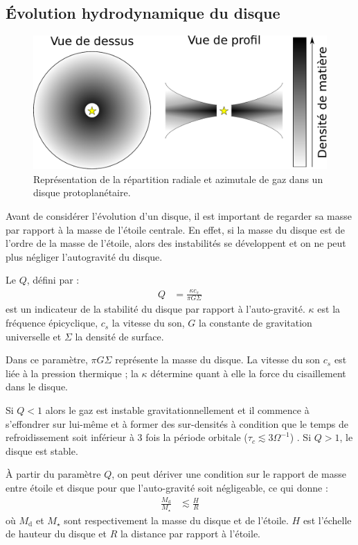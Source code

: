 \subsection{Évolution hydrodynamique du disque}
\begin{figure}[htbp]
\centering
\includegraphics[width=0.6\linewidth]{figure/disk_scheme.pdf}
\caption[Vue de face et de profil d'un disque de gaz.]{Représentation de la répartition radiale et azimutale
de gaz dans un disque protoplanétaire.}\label{fig:disk_scheme}
\end{figure}

Avant de considérer l'évolution d'un disque, il est important de regarder sa masse par rapport à la masse de l'étoile centrale. En effet, si la masse du disque est de l'ordre de la masse de l'étoile, alors des instabilités se développent et on ne peut plus négliger l'autogravité du disque. 

Le  $Q$, défini par \citep{toomre1964gravitational, goldreich1965gravitational}:
\begin{align}
Q &= \frac{\kappa c_{s}}{\pi G \Sigma}
\end{align}
est un indicateur de la stabilité du disque par rapport à l'auto-gravité. $\kappa$ est la fréquence épicyclique, $c_s$ la vitesse du son, $G$ la constante de gravitation universelle et $\Sigma$ la densité de surface. 

Dans ce paramètre, $\pi G \Sigma$ représente la masse du disque. La vitesse du son $c_{s}$ est liée à la pression thermique ; la  $\kappa$ détermine quant à elle la force du cisaillement dans le disque.

\bigskip

Si $Q<1$ alors le gaz est instable gravitationnellement et il commence à s'effondrer sur lui-même et à former des sur-densités à
condition que le temps de refroidissement soit inférieur à 3 fois la période orbitale ($\tau_c \lesssim 3 \Omega^{-1}$)
\citep{gammie2001nonlinear}.
Si $Q>1$, le disque est stable.

À partir du paramètre $Q$, on peut dériver une condition sur le rapport de masse entre étoile et disque pour que l'auto-gravité soit négligeable, ce qui donne \citep{gammie2001nonlinear} : 
\begin{align}
\frac{M_\text{d}}{M_\star} &\lesssim \frac{H}{R}
\end{align}
où $M_\text{d}$ et $M_\star$ sont respectivement la masse du disque et de l'étoile. $H$ est l'échelle de hauteur du disque et $R$ la distance par rapport à l'étoile.

